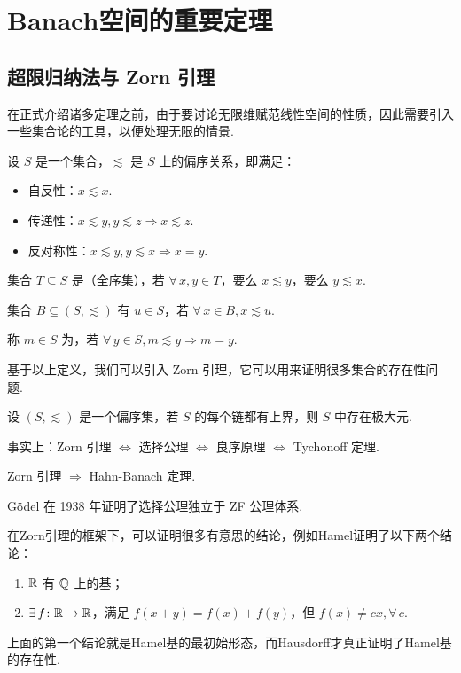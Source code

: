 \chapter{Banach空间的重要定理}


\section{超限归纳法与 Zorn 引理}

在正式介绍诸多定理之前，由于要讨论无限维赋范线性空间的性质，因此需要引入一些集合论的工具，以便处理无限的情景.

\begin{definition}[偏序关系]
    设 $S$ 是一个集合，$\lesssim$ 是 $S$ 上的偏序关系，即满足：
    \begin{itemize}
        \item 自反性：$x \lesssim x$.
        \item 传递性：$x \lesssim y, y \lesssim z \Rightarrow x \lesssim z$.
        \item 反对称性：$x \lesssim y, y \lesssim x \Rightarrow x = y$.
    \end{itemize}
\end{definition}

集合 $T \subseteq S$ 是（全序集），若 $\forall\, x, y \in T$，要么 $x \lesssim y$，要么 $y \lesssim x$.\par
集合 $B \subseteq (S, \lesssim)$ 有 $u \in S$，若 $\forall\, x \in B, x \lesssim u$.\par
称 $m \in S$ 为，若 $\forall\, y \in S, m \lesssim y \Rightarrow m = y$.\par

基于以上定义，我们可以引入 Zorn 引理，它可以用来证明很多集合的存在性问题.
\begin{lemma}[Zorn 引理]
    设 $(S, \lesssim)$ 是一个偏序集，若 $S$ 的每个链都有上界，则 $S$ 中存在极大元.
\end{lemma}

\begin{remark}
    事实上：Zorn 引理 $\iff$ 选择公理 $\iff$ 良序原理 $\iff$ Tychonoff 定理.\par
    Zorn 引理 $\Rightarrow$ Hahn-Banach 定理.\par
    Gödel 在 1938 年证明了选择公理独立于 ZF 公理体系.
\end{remark}

在Zorn引理的框架下，可以证明很多有意思的结论，例如Hamel证明了以下两个结论：
\begin{enumerate}[label=(\arabic*),leftmargin=2em]
    \item  $\mathbb{R}$ 有 $\mathbb{Q}$ 上的基；
    \item  $\exists\, f \colon \mathbb{R} \to \mathbb{R}$，满足 $f(x+y)=f(x)+f(y)$，但 $f(x) \neq cx, \forall\, c$.
\end{enumerate}\par
上面的第一个结论就是Hamel基的最初始形态，而Hausdorff才真正证明了Hamel基的存在性.

